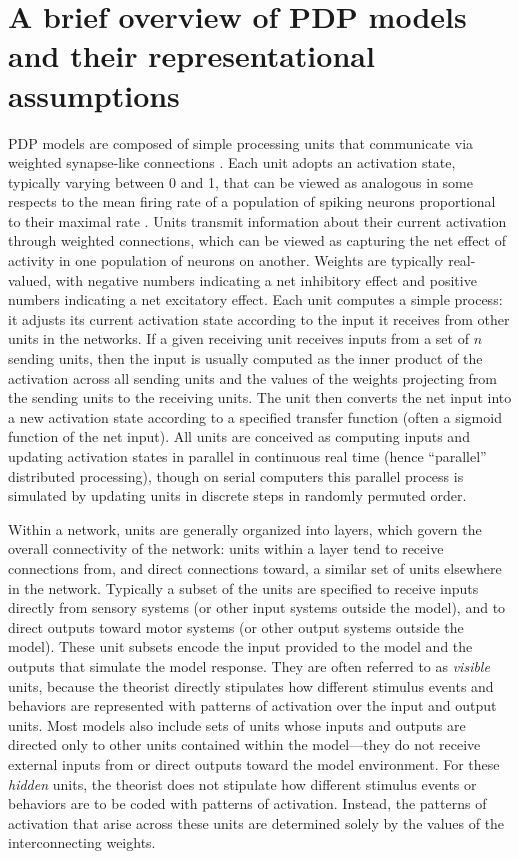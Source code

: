 \section{A brief overview of PDP models and their representational assumptions}
PDP models are composed of simple processing units that communicate via weighted synapse-like connections \cite{McClellandRumelhart86,RogersMcClellandPDP25}.
Each unit adopts an activation state, typically varying between 0 and 1, that can be viewed as analogous in some respects to the mean firing rate of a population of spiking neurons proportional to their maximal rate \cite{ZipserAndersen88}. Units transmit information about their current activation through weighted connections, which can be viewed as capturing the net effect of activity in one population of neurons on another. Weights are typically real-valued, with negative numbers indicating a net inhibitory effect and positive numbers indicating a net excitatory effect. Each unit computes a simple process: it adjusts its current activation state according to the input it receives from other units in the networks. If a given receiving unit receives inputs from a set of $n$ sending units, then the input is usually computed as the inner product of the activation across all sending units and the values of the weights projecting from the sending units to the receiving units. The unit then converts the net input into a new activation state according to a specified transfer function (often a sigmoid function of the net input). All units are conceived as computing inputs and updating activation states in parallel in continuous real time (hence ``parallel'' distributed processing), though on serial computers this parallel process is simulated by updating units in discrete steps in randomly permuted order.

Within a network, units are generally organized into layers, which govern the overall connectivity of the network: units within a layer tend to receive connections from, and direct connections toward, a similar set of units elsewhere in the network. Typically a subset of the units are specified to receive inputs directly from sensory systems (or other input systems outside the model), and to direct outputs toward motor systems (or other output systems outside the model). These unit subsets encode the input provided to the model and the outputs that simulate the model response. They are often referred to as {\em visible} units, because the theorist directly stipulates how different stimulus events and behaviors are represented with patterns of activation over the input and output units. Most models also include sets of units whose inputs and outputs are directed only to other units contained within the model---they do not receive external inputs from or direct outputs toward the model environment. For these {\em hidden} units, the theorist does not stipulate how different stimulus events or behaviors are to be coded with patterns of activation. Instead, the patterns of activation that arise across these units are determined solely by the values of the interconnecting weights. 

